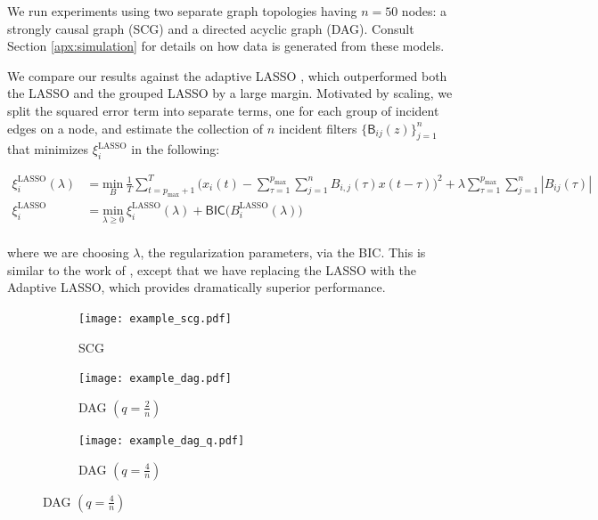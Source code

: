 \documentclass{statsoc}
\def\B{\mathsf{B}}  %
\begin{document}
We run experiments using two separate graph topologies having $n = 50$
nodes: a strongly causal graph (SCG) and a directed acyclic graph
(DAG).  Consult Section \ref{apx:simulation} for details on how data
is generated from these models.

We compare our results against the adaptive LASSO
\cite{adaptive_lasso_zou2006}, which outperformed both the LASSO and
the grouped LASSO by a large margin.  Motivated by scaling, we split the squared error
term into separate terms, one for each group of incident edges on a
node, and estimate the collection of $n$ incident filters
$\big\{\B_{ij}(z)\big\}_{j = 1}^n$ that minimizes
$\xi_i^{\text{LASSO}}$ in the following:

\begin{equation}
  \begin{aligned}
  \xi_i^{\text{LASSO}}(\lambda) &= \underset{B}{\text{min}}\ \frac{1}{T}\sum_{t = p_{\text{max}} + 1}^T\big(x_i(t) - \sum_{\tau = 1}^{p_{\text{max}}}\sum_{j = 1}^n B_{i, j}(\tau) x(t - \tau)\big)^2 + \lambda \sum_{\tau = 1}^{p_{\text{max}}} \sum_{j = 1}^n |B_{ij}(\tau)|\\
  \xi_i^{\text{LASSO}} &= \underset{\lambda \ge 0}{\text{min}}\ \xi_i^{\text{LASSO}}(\lambda) + \mathsf{BIC}\big(B_i^{\text{LASSO}}(\lambda)\big)\\
  \end{aligned}
\end{equation}

where we are choosing $\lambda$, the regularization parameters, via the BIC.
This is similar to the work of \cite{arnold2007temporal}, except that
we have replacing the LASSO with the Adaptive LASSO, which provides
dramatically superior performance.

\begin{figure}
  \centering
  \caption{Representative Random Graph Topologies on $n = 50$ Nodes}
  \label{fig:random_graph_topologies}
  \begin{subfigure}[b]{0.3\textwidth}
    \caption{SCG}
    \texttt{[image: example\_scg.pdf]}
  \end{subfigure}
  \begin{subfigure}[b]{0.3\textwidth}
    \caption{DAG $(q = \frac{2}{n})$}
    \texttt{[image: example\_dag.pdf]}
  \end{subfigure}
  \begin{subfigure}[b]{0.3\textwidth}
    \caption{DAG $(q = \frac{4}{n})$}
    \texttt{[image: example\_dag\_q.pdf]}
  \end{subfigure}
\end{figure}
\end{document}
